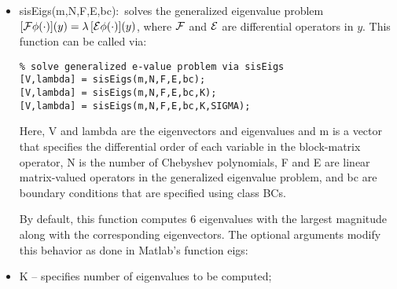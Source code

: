 \documentclass[%
secnumarabic,%
 amssymb, amsmath,%
 aps,prf,superscriptaddress,longbibliography
frontmatterverbose,
]{revtex4-2}
\begin{document}
\begin{itemize}
\begin{lstlisting}
% boundary operators
OpLeft = cell(2,1); OpLeft{1} = 2; OpLeft{2} = 3; % for 2 Dy + 3 I
OpRight = cell(2,1); OpRight{1} = 5; OpRight{2} = 6; % for 5 Dy + 6 I

% Robin BCs at y = \pm 1
bc.Operator = {OpLeft; OpRight};
bc.Points = [-1; 1];
bc.Values = [4; 7];

% Use sisSolves to solve TPBVP
% inputs to sisSolves: differential order m, N, operator, BCs, input forcing d
solution = sisSolves(m,N,A,bc,d); 
\end{lstlisting}
  
  \item {\sf sisEigs(m,N,F,E,bc):}~solves the generalized eigenvalue problem $[ \mathcal{F} \phi (\cdot) ](y) = \lambda \, [ \mathcal{E} \phi (\cdot) ] (y)$, where $\mathcal{F}$ and $\mathcal{E}$ are differential operators in $y$. This function can be called via:
\begin{lstlisting}
% solve generalized e-value problem via sisEigs 
[V,lambda] = sisEigs(m,N,F,E,bc);
[V,lambda] = sisEigs(m,N,F,E,bc,K);
[V,lambda] = sisEigs(m,N,F,E,bc,K,SIGMA);
\end{lstlisting}   
Here, {\sf V} and {\sf lambda} are the eigenvectors and eigenvalues and {\sf m} is a vector that specifies the differential order of each variable in the block-matrix operator, {\sf N} is the number of Chebyshev polynomials, {\sf F} and {\sf E} are linear matrix-valued operators in the generalized eigenvalue problem, and {\sf bc} are boundary conditions that are specified using class {\sf BCs}. 
  
  By default, this function computes 6 eigenvalues with the largest magnitude along with the corresponding eigenvectors. The optional arguments modify this behavior as done in Matlab's function {\sf eigs}: 
  	\bi
	\item {\sf K} -- specifies number of eigenvalues to be computed;
  

\end{itemize}
\end{document}
